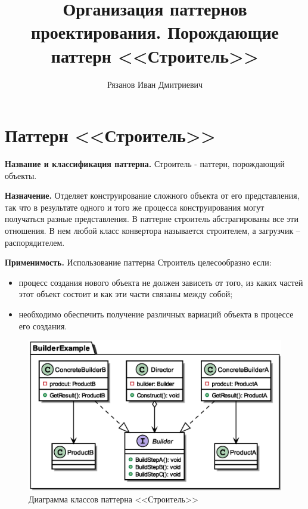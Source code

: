 \documentclass[PI,LAB]{HSEUniversity}
\title{Организация паттернов проектирования. Порождающие паттерн <<Строитель>>}
\author{Рязанов Иван Дмитриевич}
\begin{document}
\maketitle
\chapter{Паттерн <<Строитель>>}
\textbf{Название и классификация паттерна.}
Строитель - паттерн, порождающий объекты.

\textbf{Назначение.}
Отделяет конструирование сложного объекта от его представления, так что в результате одного и того же процесса конструирования могут получаться разные представления.
В паттерне строитель абстрагированы все эти отношения. В нем любой класс конвертора называется строителем, а загрузчик – распорядителем.

\textbf{Применимость.}
Использование паттерна Строитель целесообразно если:
\begin{itemize}
  \item процесс создания нового объекта не должен зависеть от того, из каких частей этот объект состоит и как эти части связаны между собой;
  \item необходимо обеспечить получение различных вариаций объекта в процессе его создания.
\end{itemize}
\clearpage

\begin{figure}[p]
  \centering
  \includegraphics[scale=0.6]{Builder_CD.eps}
  \caption{Диаграмма классов паттерна <<Строитель>>}
\end{figure}
\end{document}
